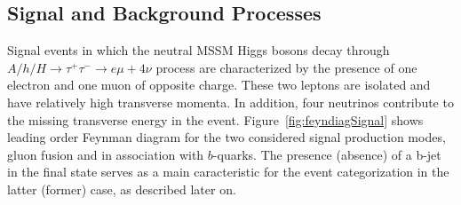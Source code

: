 \subsection{Signal and Background Processes}
Signal events in which the neutral MSSM Higgs bosons decay through 
$A/h/H \rightarrow \tau^+ \tau^- \rightarrow e \mu +4\nu$ process are characterized 
by the presence of one electron and one muon of opposite charge. These two leptons are isolated and have 
relatively high transverse momenta. In addition, four neutrinos contribute to the missing transverse energy in the event. 
Figure~\ref{fig:feyndiagSignal} shows leading order Feynman diagram for the two considered signal production modes,
gluon fusion and in association with $b$-quarks.
The presence (absence) of a b-jet in the final state serves as a main caracteristic for the event categorization
in the latter (former) case, as described later on.

